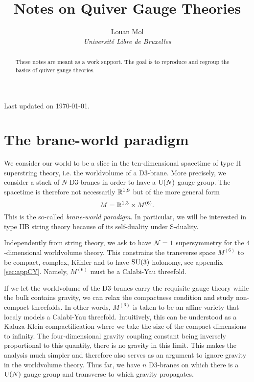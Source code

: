 \documentclass[a4paper,10pt]{article}
\title{\textbf{Notes on Quiver Gauge Theories}}
\author{Louan Mol\\ \textit{Université Libre de Bruxelles}}
\date{}
\begin{document}
\begin{titlepage}
    
    \maketitle

    \thispagestyle{empty}

    \vspace{2cm}

    \begin{abstract}
        These notes are meant as a work support. The goal is to reproduce and regroup the basics of quiver gauge theories. 
    \end{abstract}

    \vfill

    \hfill Last updated on \today.
    
\end{titlepage}
  
\pagebreak

\tableofcontents

\pagebreak

\nocite{*}

\section{The brane-world paradigm}

    We consider our world to be a slice in the ten-dimensional spacetime of type II superstring theory, i.e. the worldvolume of a D$3$-brane. More precisely, we consider a stack of $N$ D$3$-branes in order to have a $\text{U}(N)$ gauge group. The spacetime is therefore not necessarily $\mathbb{R}^{1,9}$ but of the more general form
    \begin{equation*}
        M = \mathbb{R}^{1,3}\times M^{(6)}.
    \end{equation*}
    This is the so-called \emph{brane-world paradigm}. In particular, we will be interested in type IIB string theory because of its self-duality under S-duality\marker.
    
    Independently from string theory, we ask to have $\mathcal{N}=1$ supersymmetry for the $4$-dimensional worldvolume theory. This constrains the transverse space $M^{(6)}$ to be compact, complex, Kähler and to have $\text{SU}(3)$ holonomy, see appendix \ref{sec:appCY}. Namely, $M^{(6)}$ must be a Calabi-Yau threefold.
    
    If we let the worldvolume of the D$3$-branes carry the requisite gauge theory while the bulk contains gravity, we can relax the compactness condition and study non-compact threefolds. In other words, $M^{(6)}$ is taken to be an affine variety that localy models a Calabi-Yau threefold. Intuitively, this can be understood as a Kaluza-Klein compactification where we take the size of the compact dimensions to infinity. The four-dimensional gravity coupling constant being inversely proportional to this quantity, there is no gravity in this limit. This makes the analysis much simpler and therefore also serves as an argument to ignore gravity in the worldvolume theory. Thus far, we have $n$ D$3$-branes on which there is a $\text{U}(N)$ gauge group and transverse to which gravity propagates.
\end{document}
